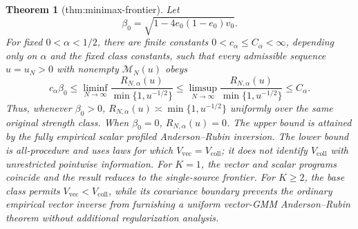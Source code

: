\documentclass{article}
\newtheorem{theorem}{Theorem}
\begin{document}
\begin{theorem}[thm:minimax-frontier]\label{thm:minimax-frontier}
Let
\[
\beta_0=\sqrt{1-4e_0(1-e_0)v_0}.
\]
For fixed \(0<\alpha<1/2\), there are finite constants \(0<c_\alpha\le C_\alpha<\infty\), depending only on \(\alpha\) and the fixed class constants, such that every admissible sequence \(u=u_N>0\) with nonempty \(\mathcal M_N(u)\) obeys
\[
c_\alpha\beta_0
\le\liminf_{N\to\infty}
\frac{R_{N,\alpha}(u)}{\min\{1,u^{-1/2}\}}
\le\limsup_{N\to\infty}
\frac{R_{N,\alpha}(u)}{\min\{1,u^{-1/2}\}}
\le C_\alpha.
\]
Thus, whenever \(\beta_0>0\), \(R_{N,\alpha}(u)\asymp\min\{1,u^{-1/2}\}\) uniformly over the same original strength class. When \(\beta_0=0\), \(R_{N,\alpha}(u)=0\). The upper bound is attained by the fully empirical scalar profiled Anderson--Rubin inversion. The lower bound is all-procedure and uses laws for which \(V_{\mathrm{vec}}=V_{\mathrm{coll}}\); it does not identify \(V_{\mathrm{coll}}\) with unrestricted pointwise information. For \(K=1\), the vector and scalar programs coincide and the result reduces to the single-source frontier. For \(K\ge2\), the base class permits \(V_{\mathrm{vec}}<V_{\mathrm{coll}}\), while its covariance boundary prevents the ordinary empirical vector inverse from furnishing a uniform vector-GMM Anderson--Rubin theorem without additional regularization analysis.
\end{theorem}
\end{document}
